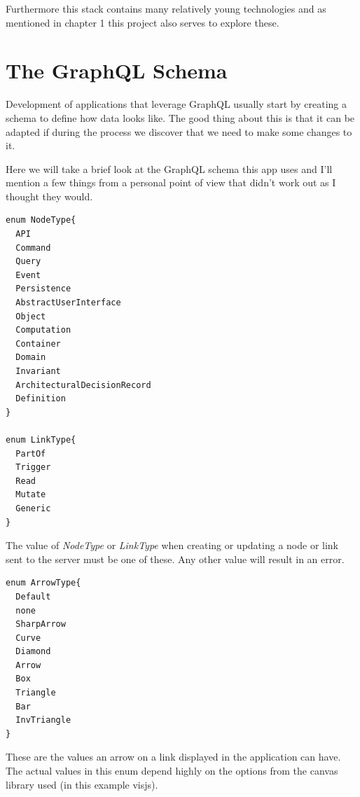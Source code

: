 Furthermore this stack contains many relatively young technologies and as mentioned in chapter 1 this project also serves to explore these.

\section{The GraphQL Schema}
Development of applications that leverage GraphQL usually start by creating a schema to define how data looks like. The good thing about this is that it can be adapted if during the process we discover that we need to make some changes to it.

Here we will take a brief look at the GraphQL schema this app uses and I'll mention a few things from a personal point of view that didn't work out as I thought they would.
\begin{lstlisting}[caption={GraphQL Enums},label={enums}]
enum NodeType{
  API
  Command
  Query
  Event
  Persistence
  AbstractUserInterface
  Object
  Computation
  Container
  Domain
  Invariant
  ArchitecturalDecisionRecord
  Definition
}

enum LinkType{
  PartOf
  Trigger
  Read
  Mutate
  Generic
}
\end{lstlisting}
The value of \emph{NodeType} or \emph{LinkType} when creating or updating a node or link sent to the server must be one of these. Any other value will result in an error.

\begin{lstlisting}
enum ArrowType{
  Default
  none
  SharpArrow
  Curve
  Diamond
  Arrow
  Box
  Triangle
  Bar
  InvTriangle
}
\end{lstlisting}
These are the values an arrow on a link displayed in the application can have. The actual values in this enum depend highly on the options from the canvas library used (in this example visjs).

